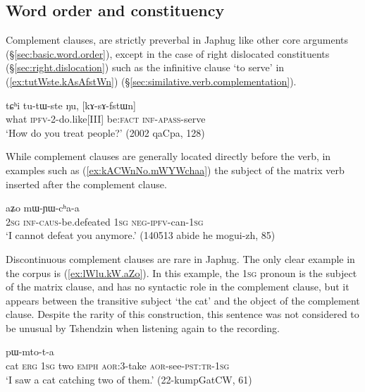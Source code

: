 \subsection{Word order and constituency}  \label{sec:complement.word.order}
Complement clauses, are strictly preverbal in Japhug like other core arguments (§\ref{sec:basic.word.order}), except in the case of right dislocated constituents (§\ref{sec:right.dislocation}) such as the infinitive clause  `to serve' in (\ref{ex:tutWste.kAsAfstWn}) (§\ref{sec:similative.verb.complementation}).

\begin{exe}
\ex \label{ex:tutWste.kAsAfstWn}
\gll tɕʰi tu-tɯ-ste ŋu, [kɤ-sɤ-fstɯn]\\
what \textsc{ipfv}-2-do.like[III] be:\textsc{fact} \textsc{inf}-\textsc{apass}-serve \\
\glt `How do you treat people?' (2002 qaCpa, 128)
\end{exe}

While complement clauses are generally located directly before the verb, in examples such as (\ref{ex:kACWnNo.mWYWchaa}) the subject of the matrix verb inserted after the complement clause.

\begin{exe}
\ex \label{ex:kACWnNo.mWYWchaa}
 aʑo mɯ-ɲɯ-cʰa-a \\
\textsc{2sg} \textsc{inf}-\textsc{caus}-be.defeated \textsc{1sg} \textsc{neg}-\textsc{ipfv}-can-\textsc{1sg} \\
\glt `I cannot defeat you anymore.' (140513 abide he mogui-zh, 85)
\end{exe}

Discontinuous complement clauses are rare in Japhug. The only clear example in the corpus is (\ref{ex:lWlu.kW.aZo}). In this example, the \textsc{1sg} pronoun  is the subject of the matrix clause, and has no syntactic role in the complement clause, but it appears between the transitive subject  `the cat' and the object  of the complement clause. Despite the rarity of this construction, this sentence was not considered to be unusual by Tshendzin when listening again to the recording.
 
 \begin{exe}
\ex \label{ex:lWlu.kW.aZo}
 pɯ-mto-t-a \\
cat \textsc{erg} \textsc{1sg} two \textsc{emph} \textsc{aor}:3\flobv{}-take \textsc{aor}-see-\textsc{pst}:\textsc{tr}-\textsc{1sg} \\
\glt `I saw a cat catching two of them.' (22-kumpGatCW, 61)
\end{exe}

